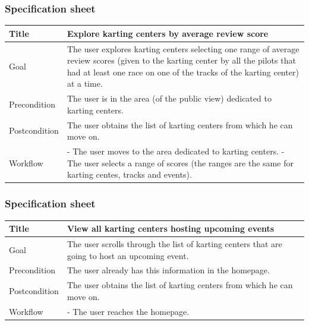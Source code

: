 \documentclass{beamer}
\begin{document}
\begin{frame}
    \frametitle{Specification sheet}
    \begin{table}
        \tiny
        \begin{tabular}{|p{2cm}|p{6cm}|}
        \hline
        Title & \textbf{Explore karting centers by average review score} \\
        \hline
        Goal & The user explores karting centers selecting one range of average review scores (given to the karting center by all the pilots
        that had at least one race on one of the tracks of the karting center) at a time. \\
        \hline
        Precondition & The user is in the area (of the public view) dedicated to karting centers.\\
        \hline
        Postcondition & The user obtains the list of karting centers from which he can move on.\\
        \hline
        Workflow &
        - The user moves to the area dedicated to karting centers. \newline
        - The user selects a range of scores (the ranges are the same for karting centes, tracks and events). \\
        \hline
        \end{tabular}
\end{table}
\end{frame}

\begin{frame}
    \frametitle{Specification sheet}
    \begin{table}
        \tiny
        \begin{tabular}{|p{2cm}|p{6cm}|}
        \hline
        Title & \textbf{View all karting centers hosting upcoming events} \\
        \hline
        Goal & The user scrolls through the list of karting centers that are going to host an upcoming event. \\
        \hline
        Precondition & The user already has this information in the homepage.\\
        \hline
        Postcondition & The user obtains the list of karting centers from which he can move on.\\
        \hline
        Workflow &
        - The user reaches the homepage. \\
        \hline
        \end{tabular}
\end{table}
\end{frame}
\end{document}
